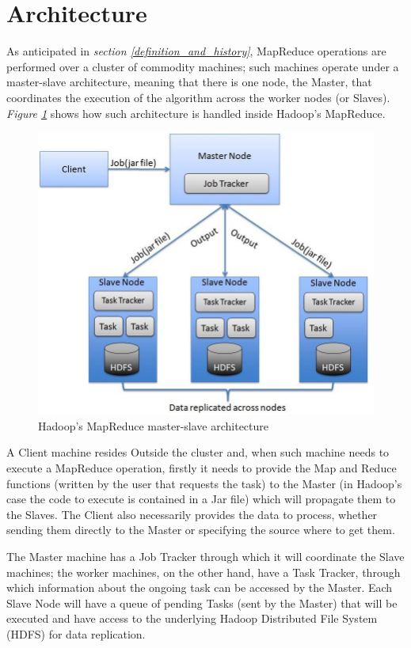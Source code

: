 \section{Architecture}\label{map_reduce_architecture}
As anticipated in \textit{section \ref{definition_and_history}}, MapReduce operations are performed over a cluster of commodity machines; such machines operate under a master-slave architecture, meaning that there is one node, the Master, that coordinates the execution of the algorithm across the worker nodes (or Slaves). \textit{Figure \ref{fig:hadoop_master_slave_architecture}} shows how such architecture is handled inside Hadoop's MapReduce.

\begin{figure}[H]
    \centering
    \includegraphics[scale=0.45]{document/chapters/chapter_4/images/hadoop_master_slave_architecture.png}
    \caption{Hadoop's MapReduce master-slave architecture\cite{hadoop_map_reduce}}
    \label{fig:hadoop_master_slave_architecture}
\end{figure}

A Client machine resides Outside the cluster and, when such machine needs to execute a MapReduce operation, firstly it needs to provide the Map and Reduce functions (written by the user that requests the task) to the Master (in Hadoop's case the code to execute is contained in a Jar file) which will propagate them to the Slaves. The Client also necessarily provides the data to process, whether sending them directly to the Master or specifying the source where to get them.

The Master machine has a Job Tracker through which it will coordinate the Slave machines; the worker machines, on the other hand, have a Task Tracker, through which information about the ongoing task can be accessed by the Master. Each Slave Node will have a queue of pending Tasks (sent by the Master) that will be executed and have access to the underlying Hadoop Distributed File System (HDFS) for data replication.